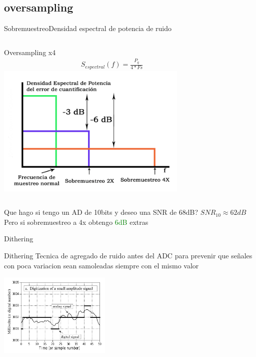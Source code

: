  \subsection{oversampling}
 \begin{frame}{Sobremuestreo}{Densidad espectral de potencia de ruido}
    \begin{columns}[onlytextwidth]
       Oversampling x4
       \begin{align*}
          S_{espectral}(f) = \frac{P_q}{4*Fs}
       \end{align*}
       \center\includegraphics[width=0.8\textwidth]{1_clase/oversampling}
    \end{columns}
    \vfill
    Que hago si tengo un AD de 10bits y deseo una SNR de 68dB?
    $SNR_{10}\approx 62dB$
    Pero si sobremuestreo a 4x obtengo \textcolor{green}{6dB} extras
 \end{frame}
 \begin{frame}{Dithering}{}
    \begin{block}{Dithering}
       Tecnica de agregado de ruido antes del ADC para prevenir que señales con poca variacion sean samoleadas siempre con el mismo valor
    \end{block}
       \center\includegraphics[width=0.4\textwidth]{1_clase/dither}
    \vfill
 \end{frame}
